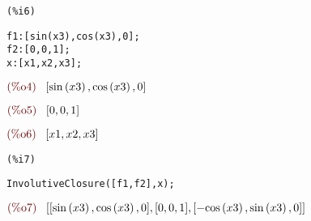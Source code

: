\noindent
\begin{minipage}[t]{8ex}
\color{red}\bf
\begin{verbatim}
(%i6) 
\end{verbatim}
\end{minipage}
\begin{minipage}[t]{\textwidth}
\color{blue}
\begin{verbatim}
f1:[sin(x3),cos(x3),0];
f2:[0,0,1];
x:[x1,x2,x3];
\end{verbatim}
\end{minipage}
\begin{math}\displaystyle
\parbox{8ex}{\color{labelcolor}(\%o4) }
[\mathrm{sin}\left( x3\right) ,\mathrm{cos}\left( x3\right) ,0]
\end{math}

\noindent
\begin{math}\displaystyle
\parbox{8ex}{\color{labelcolor}(\%o5) }
[0,0,1]
\end{math}

\noindent
\begin{math}\displaystyle
\parbox{8ex}{\color{labelcolor}(\%o6) }
[x1,x2,x3]
\end{math}


\noindent
\begin{minipage}[t]{8ex}
\color{red}\bf
\begin{verbatim}
(%i7) 
\end{verbatim}
\end{minipage}
\begin{minipage}[t]{\textwidth}
\color{blue}
\begin{verbatim}
InvolutiveClosure([f1,f2],x);
\end{verbatim}
\end{minipage}
\begin{math}\displaystyle
\parbox{8ex}{\color{labelcolor}(\%o7) }
[[\mathrm{sin}\left( x3\right) ,\mathrm{cos}\left( x3\right) ,0],[0,0,1],[-\mathrm{cos}\left( x3\right) ,\mathrm{sin}\left( x3\right) ,0]]
\end{math}
